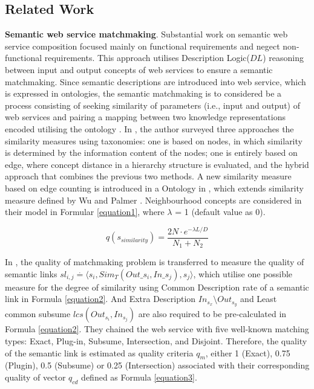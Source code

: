 \documentclass{llncs}
\begin{document}
\subsection{Related Work}
\textbf{Semantic web service matchmaking}. Substantial work \cite{bansal2016generalized,mier2015integrated} on semantic web service composition focused mainly on functional requirements and negect non-functional requirements. This approach utilises Description Logic($DL$) \cite{baader2003description} reasoning between input and output concepts of web services to ensure a semantic matchmaking. Since semantic descriptions are introduced into web service, which is expressed in ontologies, the semantic matchmaking is to considered be a process consisting of seeking similarity of parameters (i.e., input and output) of web services and pairing a mapping between two knowledge representations encoded utilising the ontology \cite{lecue2006formal}. In \cite{shet2012new}, the author surveyed three approaches the similarity measures using taxonomies: one is based on nodes, in which similarity is determined by the information content of the nodes; one is entirely based on edge, where concept distance in a hierarchy structure is evaluated,  and the hybrid approach that combines the previous two methods. A new similarity measure based on edge counting is introduced in a Ontology in \cite{shet2012new}, which extends similarity measure defined by Wu and Palmer \cite{wu1994verbs}. Neighbourhood concepts are considered in their model in Formular \ref{equation1}, where $\lambda$ = 1 (default value as 0).

\begin{equation}
q(s_ {similarity}){=} \frac{2N \cdot e^{-\lambda L/D} }{N_{1}+N_{2}}
\label{equation1}
\end{equation}

In \cite{lecue2009optimizing}, the quality of matchmaking problem is transferred to measure the quality of semantic links $sl_{i,j} \stackrel{.}{=} \langle s_{i}, Sim_{T}(Out\_s_i,In\_s_j),s_{j}  \rangle$, which utilise one possible measure for the degree of similarity using Common Description rate of a semantic link in Formula \ref{equation2}. And Extra Description $In_{s_{x}} \setminus Out_{s_{y}}$ and Least common subsume $lcs(Out_{s_i},In_{s_j})$ are also required to be pre-calculated in Formula \ref{equation2}. They chained the web service with five well-known matching types: Exact, Plug-in, Subsume, Intersection, and Disjoint. Therefore, the quality of the semantic link is estimated as quality criteria $q_{m}$, either 1 (Exact), 0.75 (Plugin), 0.5 (Subsume) or 0.25 (Intersection) associated with their corresponding quality of vector $q_{cd}$ defined as Formula \ref{equation3}.
\end{document}

